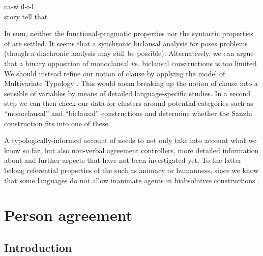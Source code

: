 \begin{exe}
	\ex	\label{ex:when, he was talking.}
		ca-w	il-i-l\\
		story	tell		that\\
	\glt	{}
\end{exe}

In sum, neither the functional-pragmatic properties nor the syntactic properties of  are settled. It seems that a synchronic biclausal analysis for  poses problems (though a diachronic analysis may still be possible). Alternatively, we can argue that a binary opposition of monoclausal vs. biclausal constructions is too limited. We should instead refine our notion of clause by applying the model of Multivariate Typology \citep{Bickel2011, Bickel2015}. This would mean breaking up the notion of clause into a sensible  of variables by means of detailed language-specific studies. In a second step we can then check our data for clusters around potential categories such as ``monoclausal'' and ``biclausal'' constructions and determine whether the Sanzhi  construction fits into one of these.

A typologically-informed account of  needs to not only take into account what we know so far, but also non-verbal agreement controllers, more detailed information about  and further aspects that have not been investigated yet. To the latter belong referential properties of the  such as animacy or humanness, since we know that some languages do not allow inanimate agents in biabsolutive constructions \citep{Forker2012a}.



\section{Person agreement}
\label{sec:Person agreement}



\subsection{Introduction}
\label{ssec:IntroductionPersonAgreement}


